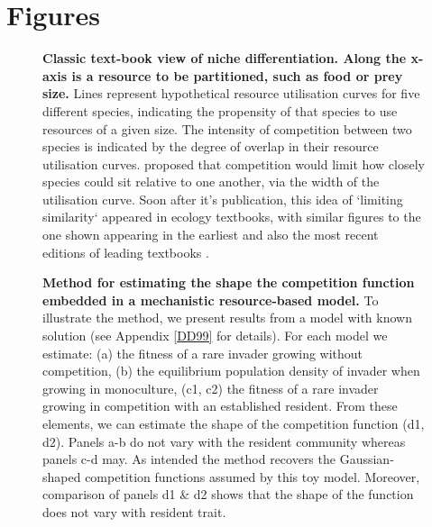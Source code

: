\documentclass[a4paper,11pt]{article}
\begin{document}
\section{Figures}

\begin{figure}[h]
  \centering
  \caption{\textbf{Classic text-book view of niche differentiation.
  Along the x-axis is a resource to be partitioned, such as food or prey size.} Lines
  represent hypothetical resource utilisation curves for five different species,
  indicating the propensity of that species to use resources of a given size.
  The intensity of competition between two species is indicated by the degree
  of overlap in their resource utilisation curves. \citet{MacArthur-1967} proposed
  that competition would limit how closely species could sit relative to one
  another, via the width of the utilisation curve. Soon after it's publication,
  this idea of `limiting similarity` appeared in ecology textbooks, with similar
  figures to the one shown appearing in the earliest and also the most recent
  editions of leading textbooks \citep{begon-1986, begon-2006, Krebs-1978, Krebs-2013,
  Ricklefs-1973, Ricklefs-1999}.}
  \label{fig:competition-kernels}
\end{figure}

\begin{figure}[h]
 \centering
 \caption{\textbf{Method for estimating the shape the competition function embedded
  in a mechanistic resource-based model.} To illustrate the method, we present
  results from a model with known solution \citep{Dieckmann-1999} (see Appendix
  \ref{DD99} for details). For each
  model we estimate: (a) the fitness of a rare invader growing without competition,
  (b) the equilibrium population density of invader when growing in monoculture,
  (c1, c2) the fitness of a rare invader growing in competition with an established
  resident. From these elements, we can estimate the shape of the competition
  function (d1, d2). Panels a-b do not vary with the resident community whereas
  panels c-d may.  As intended the method recovers the Gaussian-shaped competition
  functions assumed by this toy model. Moreover, comparison of panels d1 \& d2
  shows that the shape of the function does not vary with resident trait.
  \label{fig:components}}
\end{figure}
\end{document}
